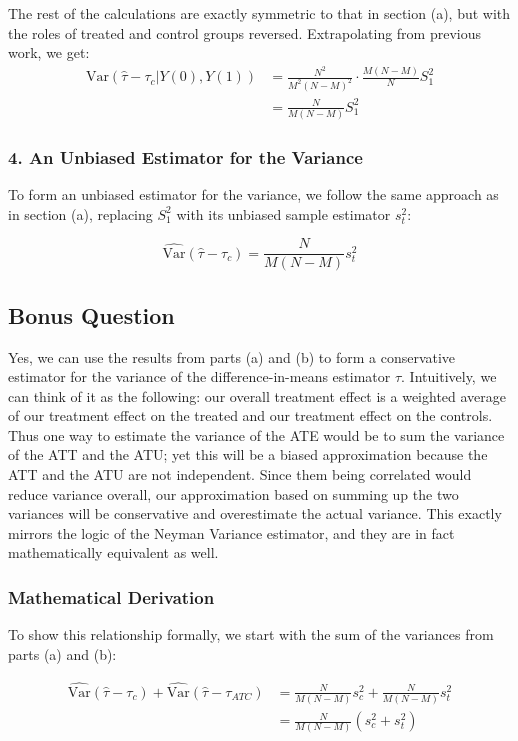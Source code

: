 \documentclass[12pt]{article}
\begin{document}
The rest of the calculations are exactly symmetric to that in section (a), but with the roles of treated and control groups reversed.
Extrapolating from previous work, we get:
\begin{align*}
\text{Var}(\hat{\tau} - \tau_{c} | Y(0), Y(1)) &= \frac{N^2}{M^2(N-M)^2} \cdot \frac{M(N-M)}{N}S_1^2 \\
&= \frac{N}{M(N-M)}S_1^2
\end{align*}

\subsubsection*{4. An Unbiased Estimator for the Variance}

To form an unbiased estimator for the variance, we follow the same approach as in section (a), replacing $S_1^2$ with its unbiased sample estimator $s_t^2$:

$$
\widehat{\text{Var}}(\hat{\tau} - \tau_{c}) = \frac{N}{M(N-M)}s_t^2
$$


\subsection{Bonus Question}

Yes, we can use the results from parts (a) and (b) to form a conservative estimator for the variance of the difference-in-means estimator $\hat{\tau}$. Intuitively, we can think of it as the following: our overall treatment effect is a weighted average of our treatment effect on the treated and our treatment effect on the controls. Thus one way to estimate the variance of the ATE would be to sum the variance of the ATT and the ATU; yet this will be a biased approximation because the ATT and the ATU are not independent. Since them being correlated would reduce variance overall, our approximation based on summing up the two variances will be conservative and overestimate the actual variance. This exactly mirrors the logic of the Neyman Variance estimator, and they are in fact mathematically equivalent as well. 

\subsubsection*{Mathematical Derivation}

To show this relationship formally, we start with the sum of the variances from parts (a) and (b):

\begin{align*}
\widehat{\text{Var}}(\hat{\tau} - \tau_c) + \widehat{\text{Var}}(\hat{\tau} - \tau_{ATC}) &= \frac{N}{M(N-M)}s_c^2 + \frac{N}{M(N-M)}s_t^2 \\
&= \frac{N}{M(N-M)}(s_c^2 + s_t^2)
\end{align*}
\end{document}

